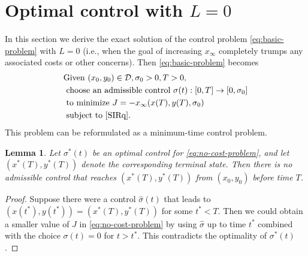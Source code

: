 \documentclass[english,12pt,letter]{article}
\newtheorem{lem}{Lemma}
\newcommand{\Rnot}{\sigma_0}
\newcommand{\dom}{{\mathcal D}}
\begin{document}
\section{Optimal control with $L=0$\label{sec:analytic}}
In this section we derive the exact solution of the control problem
\eqref{eq:basic-problem} with $L=0$ (i.e., when the goal of increasing $x_\infty$ completely
trumps any associated costs or other concerns).  Then \eqref{eq:basic-problem} becomes
\begin{align} \label{eq:no-cost-problem}
\begin{aligned}
& \text{Given } (x_0, y_0)\in \dom, \sigma_0>0, T>0, \\
& \text{ choose an admissible control } \sigma(t): [0,T] \to [0,\Rnot] \\
& \text{ to minimize }  J = -x_\infty(x(T),y(T),\sigma_0) \\
& \text{ subject to } \eqref{SIRq}.
\end{aligned}
\end{align}
This problem can be reformulated as a minimum-time control problem.  

\begin{lem} \label{lem:min-time}
Let $\sigma^*(t)$ be an optimal control for \eqref{eq:no-cost-problem}, and
let $(x^*(T),y^*(T))$ denote the corresponding terminal state.
Then there is no admissible control that reaches $(x^*(T),y^*(T))$ from $(x_0,y_0)$
before time $T$.
\end{lem}
\begin{proof}
Suppose there were a control $\hat{\sigma}(t)$ that leads to $(x(t^*),y(t^*)) = (x^*(T),y^*(T))$ for some $t^*<T$.  Then
we could obtain a smaller value of $J$ in \eqref{eq:no-cost-problem} by using
$\hat{\sigma}$ up to time $t^*$ combined with the choice $\sigma(t)=0$ for $t>t^*$.
This contradicts the optimality of $\sigma^*(t)$.
\end{proof}
\end{document}
